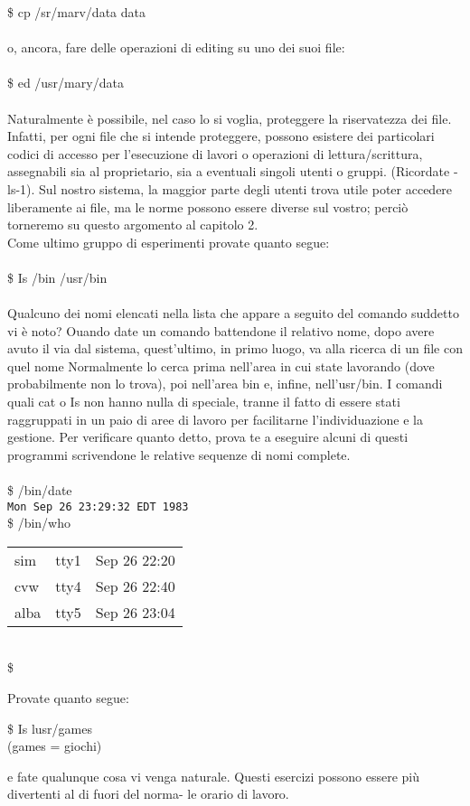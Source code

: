 \$ cp /sr/marv/data data\\\\
o, ancora, fare delle operazioni di editing su uno dei suoi file:\\\\
\$ ed /usr/mary/data\\\\
Naturalmente è possibile, nel caso lo si voglia, proteggere la riservatezza dei file. 
Infatti, per ogni file che si intende proteggere, possono esistere dei particolari codici di
accesso per l'esecuzione di lavori o operazioni di lettura/scrittura, assegnabili sia al
proprietario, sia a eventuali singoli utenti o gruppi. (Ricordate -ls-1). Sul nostro sistema, 
la maggior parte degli utenti trova utile poter accedere liberamente ai file, ma le
norme possono essere diverse sul vostro; perciò torneremo su questo argomento al
capitolo 2.\\
Come ultimo gruppo di esperimenti provate quanto segue:\\\\
\$ Is /bin /usr/bin\\\\
Qualcuno dei nomi elencati nella lista che appare a seguito del comando suddetto vi è
noto? Ouando date un comando battendone il relativo nome, dopo avere avuto il via
dal sistema, quest'ultimo, in primo luogo, va alla ricerca di un file con quel nome
Normalmente lo cerca prima nell'area in cui state lavorando (dove probabilmente
non lo trova), poi nell'area bin e, infine, nell'usr/bin. I comandi quali cat o Is non hanno 
nulla di speciale, tranne il fatto di essere stati raggruppati in un paio di aree di lavoro 
per facilitarne l'individuazione e la gestione. Per verificare quanto detto, prova
te a eseguire alcuni di questi programmi scrivendone le relative sequenze di nomi
complete.\\\\
\$ /bin/date\\
\texttt{Mon Sep 26 23:29:32 EDT 1983}\\
\$ /bin/who\\
\begin{tabular}{llc}
	sim & tty1 &Sep 26 22:20\\
	cvw& tty4 &Sep 26 22:40\\
	alba & tty5 & Sep 26 23:04
\end{tabular}\\
\$
\begin{eser}
	Provate quanto segue:\\
	\begin{multicols}{2}
		\$ Is lusr/games\\
		(games = giochi)
	\end{multicols}
	e fate qualunque cosa vi venga naturale. Questi esercizi possono essere più divertenti al di fuori del norma-
	le orario di lavoro.
\end{eser}
